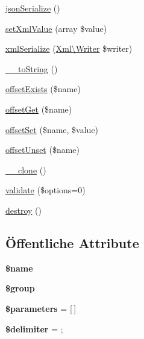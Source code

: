 \begin{DoxyCompactItemize}
\item 
\mbox{\hyperlink{class_sabre_1_1_v_object_1_1_property_aa10cefe59518806f5d78519246cc56a2}{json\+Serialize}} ()
\item 
\mbox{\hyperlink{class_sabre_1_1_v_object_1_1_property_ace4b8fee52c8ee7fecfaf7e35111af7e}{set\+Xml\+Value}} (array \$value)
\item 
\mbox{\hyperlink{class_sabre_1_1_v_object_1_1_property_a8b031a1e263d892c08d87b47a1d4e94f}{xml\+Serialize}} (\mbox{\hyperlink{class_sabre_1_1_xml_1_1_writer}{Xml\textbackslash{}\+Writer}} \$writer)
\item 
\mbox{\hyperlink{class_sabre_1_1_v_object_1_1_property_a5063d0244366177e9f3fe66f57d30811}{\+\_\+\+\_\+to\+String}} ()
\item 
\mbox{\hyperlink{class_sabre_1_1_v_object_1_1_property_a805f82e6981d54c1b2226cdef0939ff7}{offset\+Exists}} (\$name)
\item 
\mbox{\hyperlink{class_sabre_1_1_v_object_1_1_property_aa884b7a6022c1e483766f6fbe066471d}{offset\+Get}} (\$name)
\item 
\mbox{\hyperlink{class_sabre_1_1_v_object_1_1_property_ab4d18b4322a735b5f369849b4b6c32e3}{offset\+Set}} (\$name, \$value)
\item 
\mbox{\hyperlink{class_sabre_1_1_v_object_1_1_property_a1cf51094208df3e07cb5e5ec2843b163}{offset\+Unset}} (\$name)
\item 
\mbox{\hyperlink{class_sabre_1_1_v_object_1_1_property_a74de9710fdea5c3e3e5798c06cf7a46d}{\+\_\+\+\_\+clone}} ()
\item 
\mbox{\hyperlink{class_sabre_1_1_v_object_1_1_property_a8e45ac8956838485e7a66111dfe3c2fc}{validate}} (\$options=0)
\item 
\mbox{\hyperlink{class_sabre_1_1_v_object_1_1_property_aad25c9e2fcd96fc8b1abae14481a6d8f}{destroy}} ()
\end{DoxyCompactItemize}
\subsection*{Öffentliche Attribute}
\begin{DoxyCompactItemize}
\item 
\mbox{\label{class_sabre_1_1_v_object_1_1_property_a1b2c918294d631ac9bbcacf9c11d59c1}} 
{\bfseries \$name}
\item 
\mbox{\label{class_sabre_1_1_v_object_1_1_property_aefccd1a2de2bb9e3f34965adca35458c}} 
{\bfseries \$group}
\item 
\mbox{\label{class_sabre_1_1_v_object_1_1_property_a630953e9c91fd603327412c92553ef59}} 
{\bfseries \$parameters} = \mbox{[}$\,$\mbox{]}
\item 
\mbox{\label{class_sabre_1_1_v_object_1_1_property_add2f2e599b481545955a23083bda5959}} 
{\bfseries \$delimiter} = \textquotesingle{};\textquotesingle{}
\end{DoxyCompactItemize}
